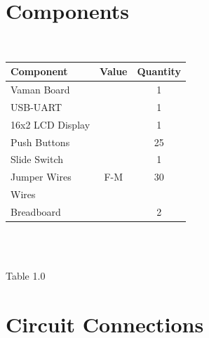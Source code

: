 \documentclass[conference]{IEEEtran}
\begin{document}
\begin{FlushLeft}
\begin{center}
\begin{tikzpicture}[node distance=1.5cm]
\end{tikzpicture}
\end{center}
\section{Components}
\
\centering
\begin{tabular}{|l|c|c|}
\hline
Component & Value & Quantity\\
\hline
Vaman Board & & 1\\
\hline
USB-UART & & 1\\
\hline
16x2 LCD Display & & 1\\
\hline
Push Buttons & & 25\\
\hline
Slide Switch&  & 1\\
\hline
Jumper Wires & F-M & 30\\
\hline
Wires &  & \\
\hline
Breadboard & & 2\\
\hline
\end{tabular}\\
\
\centerline{Table 1.0}

\section{Circuit Connections}

\end{FlushLeft}
\end{document}
